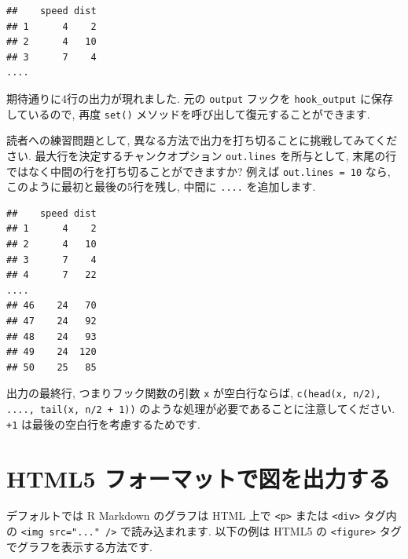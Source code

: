 \documentclass[
  11pt,
  lualatex,ja=standard,jafont=noto]{bxjsreport}
\newenvironment{Shaded}{\begin{snugshade}}{\end{snugshade}}
\newcommand{\AttributeTok}[1]{\textcolor[rgb]{0.77,0.63,0.00}{#1}}
\newcommand{\FunctionTok}[1]{\textcolor[rgb]{0.00,0.00,0.00}{#1}}
\newcommand{\NormalTok}[1]{#1}
\newcommand{\SpecialCharTok}[1]{\textcolor[rgb]{0.00,0.00,0.00}{#1}}
\begin{document}
\begin{verbatim}
##    speed dist
## 1      4    2
## 2      4   10
## 3      7    4
....
\end{verbatim}

期待通りに4行の出力が現れました. 元の \texttt{output} フックを \texttt{hook\_output} に保存しているので, 再度 \texttt{set()} メソッドを呼び出して復元することができます.

\begin{Shaded}
\end{Shaded}

読者への練習問題として, 異なる方法で出力を打ち切ることに挑戦してみてください. 最大行を決定するチャンクオプション \texttt{out.lines} を所与として, 末尾の行ではなく中間の行を打ち切ることができますか? 例えば \texttt{out.lines = 10} なら, このように最初と最後の5行を残し, 中間に \texttt{....} を追加します.

\begin{verbatim}
##    speed dist
## 1      4    2
## 2      4   10
## 3      7    4
## 4      7   22
....
## 46    24   70
## 47    24   92
## 48    24   93
## 49    24  120
## 50    25   85
\end{verbatim}

出力の最終行, つまりフック関数の引数 \texttt{x} が空白行ならば, \texttt{c(head(x, n/2), \textquotesingle{}....\textquotesingle{},\ tail(x,\ n/2\ +\ 1))} のような処理が必要であることに注意してください. \texttt{+1} は最後の空白行を考慮するためです.

\hypertarget{hook-html5}{%
\section{HTML5 フォーマットで図を出力する}\label{hook-html5}}

デフォルトでは R Markdown のグラフは HTML 上で \texttt{\textless{}p\textgreater{}} または \texttt{\textless{}div\textgreater{}} タグ内の \texttt{\textless{}img\ src="..."\ /\textgreater{}} で読み込まれます. 以下の例は HTML5 の \texttt{\textless{}figure\textgreater{}} タグでグラフを表示する方法です.
\end{document}
